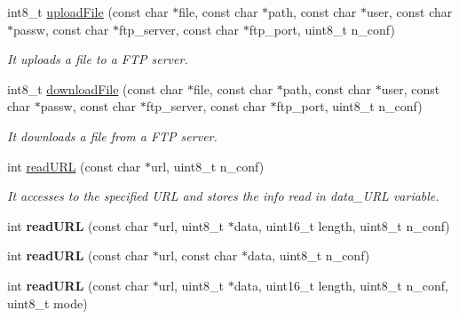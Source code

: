 \begin{DoxyCompactItemize}
\item 
int8\+\_\+t \hyperlink{class_wasp_g_p_r_s___pro__core_a0f8ba2d548fe7cd57567d5843de2a8d6}{upload\+File} (const char $\ast$file, const char $\ast$path, const char $\ast$user, const char $\ast$passw, const char $\ast$ftp\+\_\+server, const char $\ast$ftp\+\_\+port, uint8\+\_\+t n\+\_\+conf)
\begin{DoxyCompactList}\small\item\em It uploads a file to a F\+TP server. \end{DoxyCompactList}\item 
int8\+\_\+t \hyperlink{class_wasp_g_p_r_s___pro__core_a77bd5b0f6b1004f2e5c3846eef667a45}{download\+File} (const char $\ast$file, const char $\ast$path, const char $\ast$user, const char $\ast$passw, const char $\ast$ftp\+\_\+server, const char $\ast$ftp\+\_\+port, uint8\+\_\+t n\+\_\+conf)
\begin{DoxyCompactList}\small\item\em It downloads a file from a F\+TP server. \end{DoxyCompactList}\item 
int \hyperlink{class_wasp_g_p_r_s___pro__core_a3a095a6c4ae6955955589342d2d6dc78}{read\+U\+RL} (const char $\ast$url, uint8\+\_\+t n\+\_\+conf)
\begin{DoxyCompactList}\small\item\em It accesses to the specified U\+RL and stores the info read in \textquotesingle{}data\+\_\+\+U\+RL\textquotesingle{} variable. \end{DoxyCompactList}\item 
int {\bfseries read\+U\+RL} (const char $\ast$url, uint8\+\_\+t $\ast$data, uint16\+\_\+t length, uint8\+\_\+t n\+\_\+conf)\hypertarget{class_wasp_g_p_r_s___pro__core_a8f2e167932a7f12ecf18a651d5339a19}{}\label{class_wasp_g_p_r_s___pro__core_a8f2e167932a7f12ecf18a651d5339a19}

\item 
int {\bfseries read\+U\+RL} (const char $\ast$url, const char $\ast$data, uint8\+\_\+t n\+\_\+conf)\hypertarget{class_wasp_g_p_r_s___pro__core_af924366da75f8cbcf3ab99b63a68f9ee}{}\label{class_wasp_g_p_r_s___pro__core_af924366da75f8cbcf3ab99b63a68f9ee}

\item 
int {\bfseries read\+U\+RL} (const char $\ast$url, uint8\+\_\+t $\ast$data, uint16\+\_\+t length, uint8\+\_\+t n\+\_\+conf, uint8\+\_\+t mode)\hypertarget{class_wasp_g_p_r_s___pro__core_ad8423fa9b9f53df83d09ba38dd9b1f07}{}\label{class_wasp_g_p_r_s___pro__core_ad8423fa9b9f53df83d09ba38dd9b1f07}


\end{DoxyCompactItemize}
